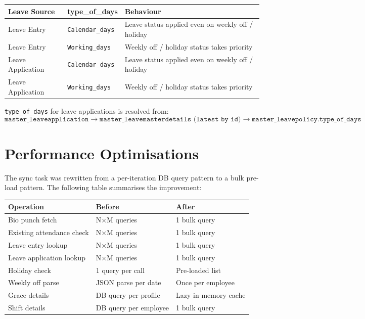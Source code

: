 \documentclass[12pt,a4paper]{article}
\begin{document}
\begin{longtable}{p{3.5cm} p{3cm} p{6cm}}
\toprule
\textbf{Leave Source} & \textbf{type\_of\_days} & \textbf{Behaviour} \\
\midrule
\endhead
Leave Entry & \texttt{Calendar\_days}
    & Leave status applied even on weekly off / holiday \\[4pt]
Leave Entry & \texttt{Working\_days}
    & Weekly off / holiday status takes priority \\[4pt]
Leave Application & \texttt{Calendar\_days}
    & Leave status applied even on weekly off / holiday \\[4pt]
Leave Application & \texttt{Working\_days}
    & Weekly off / holiday status takes priority \\
\bottomrule
\end{longtable}

\texttt{type\_of\_days} for leave applications is resolved from:
\[
\texttt{master\_leaveapplication}
\rightarrow \texttt{master\_leavemasterdetails (latest by id)}
\rightarrow \texttt{master\_leavepolicy.type\_of\_days}
\]

\section{Performance Optimisations}

The sync task was rewritten from a per-iteration DB query pattern to a
bulk pre-load pattern. The following table summarises the improvement:

\begin{longtable}{p{5.5cm} p{2.5cm} p{5.5cm}}
\toprule
\textbf{Operation} & \textbf{Before} & \textbf{After} \\
\midrule
\endhead
Bio punch fetch & N×M queries & 1 bulk query \\
Existing attendance check & N×M queries & 1 bulk query \\
Leave entry lookup & N×M queries & 1 bulk query \\
Leave application lookup & N×M queries & 1 bulk query \\
Holiday check & 1 query per call & Pre-loaded list \\
Weekly off parse & JSON parse per date & Once per employee \\
Grace details & DB query per profile & Lazy in-memory cache \\
Shift details & DB query per employee & 1 bulk query \\
\bottomrule
\end{longtable}
\end{document}
